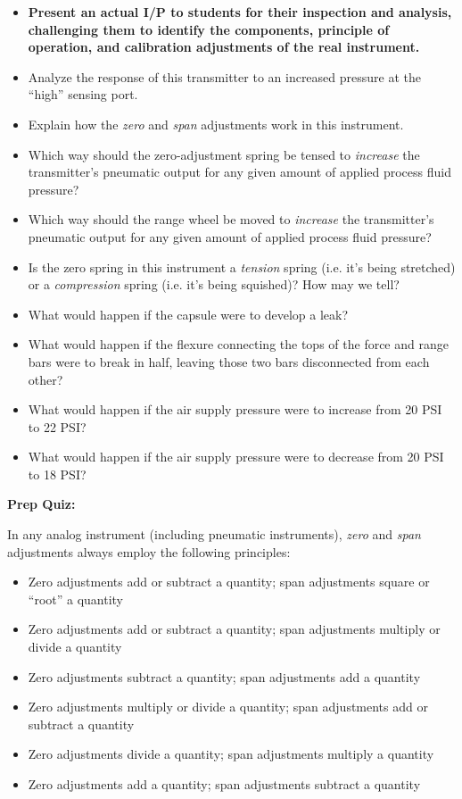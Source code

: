 \begin{itemize}
\item{} {\bf Present an actual I/P to students for their inspection and analysis, challenging them to identify the components, principle of operation, and calibration adjustments of the real instrument.}
\item{} Analyze the response of this transmitter to an increased pressure at the ``high'' sensing port.
\item{} Explain how the {\it zero} and {\it span} adjustments work in this instrument.
\item{} Which way should the zero-adjustment spring be tensed to {\it increase} the transmitter's pneumatic output for any given amount of applied process fluid pressure?
\item{} Which way should the range wheel be moved to {\it increase} the transmitter's pneumatic output for any given amount of applied process fluid pressure?
\item{} Is the zero spring in this instrument a {\it tension} spring (i.e. it's being stretched) or a {\it compression} spring (i.e. it's being squished)?  How may we tell?
\item{} What would happen if the capsule were to develop a leak?
\item{} What would happen if the flexure connecting the tops of the force and range bars were to break in half, leaving those two bars disconnected from each other?
\item{} What would happen if the air supply pressure were to increase from 20 PSI to 22 PSI?
\item{} What would happen if the air supply pressure were to decrease from 20 PSI to 18 PSI?
\end{itemize}




\vfil \eject

\noindent
{\bf Prep Quiz:}

In any analog instrument (including pneumatic instruments), {\it zero} and {\it span} adjustments always employ the following principles:

\begin{itemize}
\item{} Zero adjustments add or subtract a quantity; span adjustments square or ``root'' a quantity 
\vskip 5pt
\item{} Zero adjustments add or subtract a quantity; span adjustments multiply or divide a quantity
\vskip 5pt
\item{} Zero adjustments subtract a quantity; span adjustments add a quantity 
\vskip 5pt
\item{} Zero adjustments multiply or divide a quantity; span adjustments add or subtract a quantity 
\vskip 5pt
\item{} Zero adjustments divide a quantity; span adjustments multiply a quantity 
\vskip 5pt
\item{} Zero adjustments add a quantity; span adjustments subtract a quantity 
\end{itemize}




